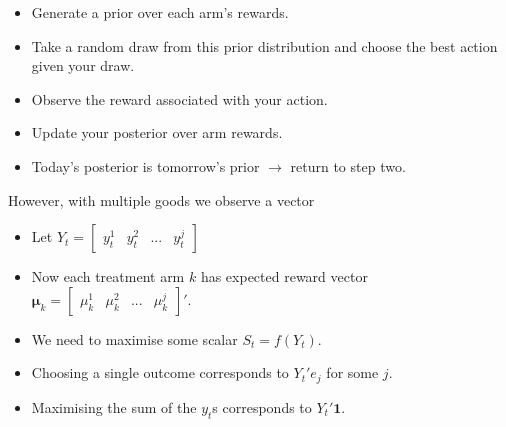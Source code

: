 \documentclass{article}
\begin{document}
    \begin{itemize}
        \item Generate a prior over each arm's rewards.
        \item Take a random draw from this prior distribution and choose the best action given your draw.
        \item Observe the reward associated with your action.
        \item Update your posterior over arm rewards.
        \item Today's posterior is tomorrow's prior $\rightarrow$ return to step two.
    \end{itemize}


However, with multiple goods we observe a vector 

\begin{itemize}
    \item Let  $Y_t = \begin{bmatrix} y^1_t & y^2_t & ... & y^j_t\end{bmatrix}$
    \item Now each treatment arm $k$ has expected reward vector $\bm{\mu}_k = \begin{bmatrix}
    \mu^1_k & \mu^2_k & ... & \mu^j_k
\end{bmatrix}'$. 
    \item We need to maximise some scalar $S_t = f(Y_t)$.
    \item Choosing a single outcome corresponds to $Y_t' e_j$ for some $j$.
    \item Maximising the sum of the $y_t$s corresponds to $Y_t' \mathbf{1}$.
\end{itemize}
\end{document}
